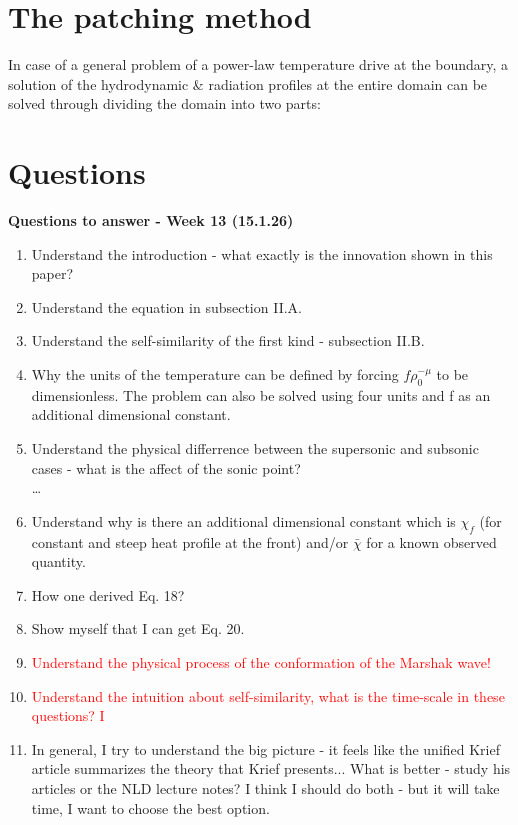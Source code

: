 \documentclass[11pt]{article}
\begin{document}
\section{The patching method}
In case of a general problem of a power-law temperature drive at the boundary, a solution of the hydrodynamic \& radiation profiles at the entire domain can be solved through dividing the domain into two parts: 


\section{Questions}
\textbf{Questions to answer - Week 13 (15.1.26)}
\begin{enumerate}
    \item Understand the introduction - what exactly is the innovation shown in this paper? 
    \item Understand the equation in subsection II.A.
    \item Understand the self-similarity of the first kind - subsection II.B.
    \item Why the units of the temperature can be defined by
    forcing $f\rho_0^{-\mu}$ to be dimensionless. The problem can also be solved using four units and f as an additional dimensional
    constant.
    \item Understand the physical differrence between the supersonic and subsonic cases - what is the affect of the sonic point?
    \\ \dots
    \item Understand why is there an additional dimensional constant which is $\chi_f$ (for constant and steep heat profile at the front) and/or $\bar{\chi}$ for a known observed quantity. 
    \item How one derived Eq. 18?
    \item Show myself that I can get Eq. 20.
    \item \textcolor{red}{Understand the physical process of the conformation of the Marshak wave!}
    \item \textcolor{red}{Understand the intuition about self-similarity, what is the time-scale in these questions? I}
    \item In general, I try to understand the big picture - it feels like the unified Krief article summarizes the theory that Krief presents... What is better - study his articles or the NLD lecture notes? I think I should do both - but it will take time, I want to choose the best option.
\end{enumerate}
\end{document}
